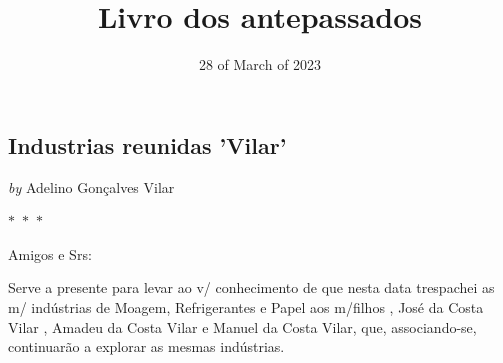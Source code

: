 \documentclass{article}
\title{ Livro dos antepassados }
\author{  }
\date{28 of March of 2023}
\begin{document}
\maketitle
\tableofcontents

\newpage
{}


\newpage

\begin{center}
\section{Industrias reunidas 'Vilar'}
\vspace{0.5cm}

    
        \textit{by} Adelino Gonçalves Vilar
    

\vspace{0.75cm}
 
    
\vspace{0.75cm}
    $\ast$~$\ast$~$\ast$  


    \begin{center}
        \begin{minipage}{0.9\textwidth}
            \setlength{\parskip}{0.2cm}
            \setlength{\parindent}{0cm}
            \fontsize{12pt}{14pt}\selectfont
            


Amigos e Srs:

Serve a presente para levar ao v/ conhecimento de que nesta data
trespachei as m/ indústrias de Moagem, Refrigerantes e Papel aos
m/filhos , José da Costa Vilar , Amadeu da Costa Vilar e Manuel da Costa Vilar, que, associando-se, continuarão a explorar as mesmas
indústrias.


\end{minipage}
\end{center}
\end{center}
\end{document}
